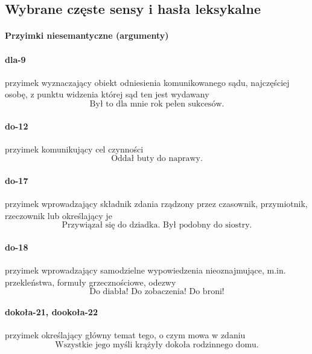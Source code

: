 \documentclass[a4paper, 12pt]{article}
\theoremstyle{remark}
\begin{document}

\subsection{Wybrane częste sensy i hasła leksykalne} %
\label{sec:podzia_ze_wzgldu_na_rol_tematyczna}


\paragraph{Przyimki niesemantyczne (argumenty)} %
\label{sub:argument}
\paragraph{dla-9}\label{prep-9}	przyimek wyznaczający obiekt odniesienia komunikowanego sądu, najczęściej osobę, z punktu widzenia której sąd ten jest wydawany
\begin{equation}
\text{Był to dla mnie rok pełen sukcesów.}
\end{equation}
\paragraph{do-12}\label{prep-12}	przyimek komunikujący cel czynności
\begin{equation}
\text{Oddał buty do naprawy.}
\end{equation}
\paragraph{do-17}\label{prep-17}	przyimek wprowadzający składnik zdania rządzony przez czasownik, przymiotnik, rzeczownik lub określający je
\begin{equation}
\text{Przywiązał się do dziadka. Był podobny do siostry.}
\end{equation}
\paragraph{do-18}\label{prep-18}	przyimek wprowadzający samodzielne wypowiedzenia nieoznajmujące, m.in. przekleństwa, formuły grzecznościowe, odezwy
\begin{equation}
\text{Do diabła! Do zobaczenia! Do broni!}
\end{equation}
\paragraph{dokoła-21, dookoła-22}\label{prep-21}	przyimek określający główny temat tego, o czym mowa w zdaniu
\begin{equation}
\text{Wszystkie jego myśli krążyły dokoła rodzinnego domu.}
\end{equation}
\end{document}
